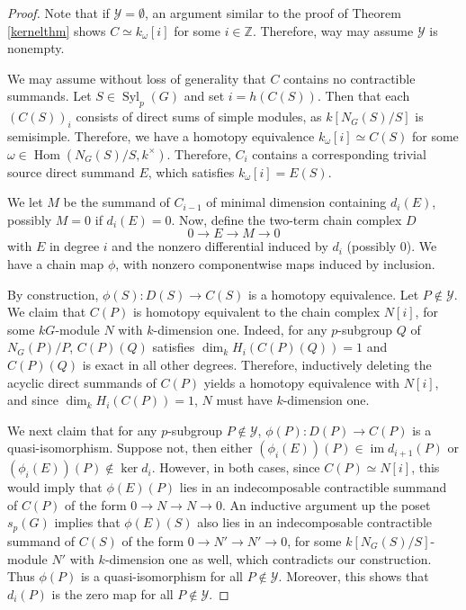 \documentclass[10pt,letterpaper, boxed, cm]{amsart}
\newcommand{\Z}{\mathbb{Z}}
\newcommand{\Hom}{\operatorname{Hom}}
\newcommand{\im}{\operatorname{im}}
\newcommand{\Syl}{\operatorname{Syl}}
\newcommand{\calY}{\mathcal{Y}}
\theoremstyle{remark}
\theoremstyle{definition}
\begin{document}
	\begin{proof}
        Note that if $\calY = \emptyset$, an argument similar to the proof of Theorem \ref{kernelthm} shows $C \simeq k_\omega[i]$ for some $i \in \Z$. Therefore, way may assume $\calY$ is nonempty.

		We may assume without loss of generality that $C$ contains no contractible summands. Let $S \in \Syl_p(G)$ and set $i = h(C(S))$. Then that each $(C(S))_i$ consists of direct sums of simple modules, as $k[N_G(S)/S]$ is semisimple. Therefore, we have a homotopy equivalence $k_{\omega}[i]\simeq C(S)$ for some $\omega \in \Hom(N_G(S)/S, k^\times)$. Therefore, $C_i$ contains a corresponding trivial source direct summand $E$, which satisfies $k_{\omega}[i]= E(S)$.

        We let $M$ be the summand of $C_{i-1}$ of minimal dimension containing $d_i(E)$, possibly $M = 0$ if $d_i(E)=0$. Now, define the two-term chain complex $D$ \[0 \to E \to M \to 0 \] with $E$ in degree $i$ and the nonzero differential induced by $d_i$ (possibly 0). We have a chain map $\phi$, with nonzero componentwise maps induced by inclusion.

		\begin{figure}[H]
			\centering
		\end{figure}

		By construction, $\phi(S): D(S) \to C(S)$ is a homotopy equivalence. Let $P \not\in \calY$. We claim that $C(P)$ is homotopy equivalent to the chain complex $N[i]$, for some $kG$-module $N$ with $k$-dimension one. Indeed, for any $p$-subgroup $Q$ of $N_G(P)/P$, $C(P)(Q)$ satisfies $\dim_k H_i(C(P)(Q)) = 1$ and $C(P)(Q)$ is exact in all other degrees. Therefore, inductively deleting the acyclic direct summands of $C(P)$ yields a homotopy equivalence with $N[i]$, and since $\dim_k H_i(C(P)) = 1$, $N$ must have $k$-dimension one.

        We next claim that for any $p$-subgroup $P \not\in \calY$, $\phi(P): D(P) \to C(P)$ is a quasi-isomorphism. Suppose not, then either $(\phi_i (E))(P) \in \im d_{i+1}(P)$ or $(\phi_i(E))(P) \not\in \ker d_i$. However, in both cases, since $C(P) \simeq N[i]$, this would imply that $\phi(E)(P)$ lies in an indecomposable contractible summand of $C(P)$ of the form $0 \to N \to N \to 0$. An inductive argument up the poset $s_p(G)$ implies that $\phi(E)(S)$ also lies in an indecomposable contractible summand of $C(S)$ of the form $0 \to N' \to N' \to 0$, for some $k[N_G(S)/S]$-module $N'$ with $k$-dimension one as well, which contradicts our construction. Thus $\phi(P)$ is a quasi-isomorphism for all $P \not\in\calY$. Moreover, this shows that $d_i(P)$ is the zero map for all $P \not\in \calY$.


\end{proof}
\end{document}
